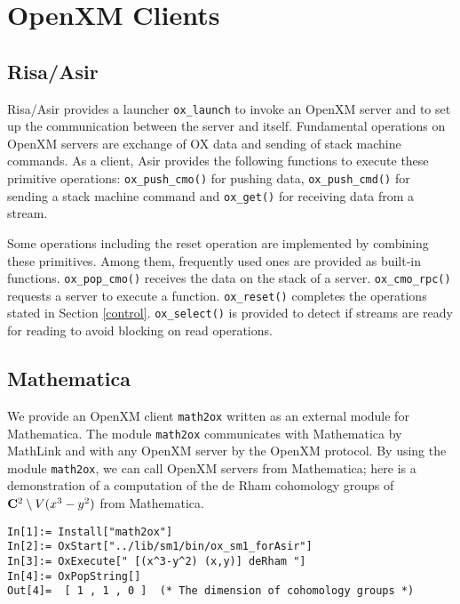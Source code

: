 
\section{OpenXM Clients}    

\subsection{Risa/Asir}

Risa/Asir provides a launcher {\tt ox\_launch}
to invoke an OpenXM server and to set up the
communication between the server and itself.
Fundamental operations on OpenXM servers are 
exchange of OX data and sending of stack machine commands.
As a client, Asir provides the following functions
to execute these primitive operations:
{\tt ox\_push\_cmo()} for pushing data,
{\tt ox\_push\_cmd()} for sending a stack machine command
and {\tt ox\_get()} for receiving data from a stream.

Some operations including the reset operation are implemented by
combining these primitives.  Among them, frequently used ones are
provided as built-in functions. 
{\tt ox\_pop\_cmo()} receives the data on the stack of a server.
{\tt ox\_cmo\_rpc()} requests a server to execute a function.
{\tt ox\_reset()} completes
the operations stated in Section \ref{control}.
{\tt ox\_select()} is provided to detect if streams are ready for
reading to avoid blocking on read operations.

\subsection{Mathematica}

We provide an OpenXM client {\tt math2ox} written as an external module
for Mathematica.  
The module {\tt math2ox} communicates with Mathematica by MathLink and
with any OpenXM server by the OpenXM protocol.  
By using the module {\tt math2ox},
we can call OpenXM servers from Mathematica;
here is a demonstration of a computation of the de Rham cohomology groups
of ${\bf C}^2 \setminus V(x^3-y^2)$ from Mathematica.

{\footnotesize
\begin{verbatim}
In[1]:= Install["math2ox"]
In[2]:= OxStart["../lib/sm1/bin/ox_sm1_forAsir"]
In[3]:= OxExecute[" [(x^3-y^2) (x,y)] deRham "]
In[4]:= OxPopString[]
Out[4]=  [ 1 , 1 , 0 ]  (* The dimension of cohomology groups *)
\end{verbatim}
}

